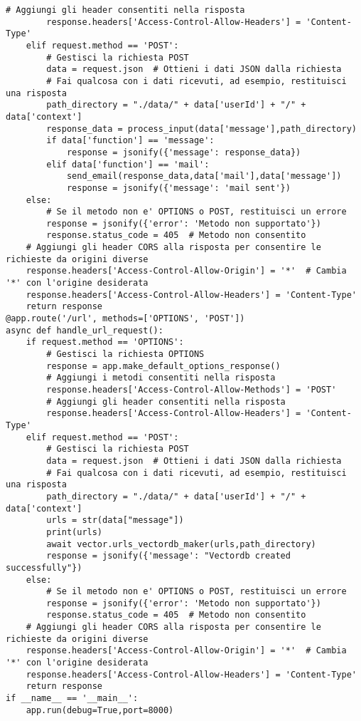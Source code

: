 \begin{lstlisting}[style=pythonstyle,caption={Codice del server.py}, label={lst:server}]
        # Aggiungi gli header consentiti nella risposta
        response.headers['Access-Control-Allow-Headers'] = 'Content-Type'
    elif request.method == 'POST':
        # Gestisci la richiesta POST
        data = request.json  # Ottieni i dati JSON dalla richiesta
        # Fai qualcosa con i dati ricevuti, ad esempio, restituisci una risposta
        path_directory = "./data/" + data['userId'] + "/" + data['context']
        response_data = process_input(data['message'],path_directory)
        if data['function'] == 'message':
            response = jsonify({'message': response_data})
        elif data['function'] == 'mail':
            send_email(response_data,data['mail'],data['message'])
            response = jsonify({'message': 'mail sent'})
    else:
        # Se il metodo non e' OPTIONS o POST, restituisci un errore
        response = jsonify({'error': 'Metodo non supportato'})
        response.status_code = 405  # Metodo non consentito
    # Aggiungi gli header CORS alla risposta per consentire le richieste da origini diverse
    response.headers['Access-Control-Allow-Origin'] = '*'  # Cambia '*' con l'origine desiderata
    response.headers['Access-Control-Allow-Headers'] = 'Content-Type'
    return response
@app.route('/url', methods=['OPTIONS', 'POST'])
async def handle_url_request():
    if request.method == 'OPTIONS':
        # Gestisci la richiesta OPTIONS
        response = app.make_default_options_response()
        # Aggiungi i metodi consentiti nella risposta
        response.headers['Access-Control-Allow-Methods'] = 'POST'
        # Aggiungi gli header consentiti nella risposta
        response.headers['Access-Control-Allow-Headers'] = 'Content-Type'
    elif request.method == 'POST':
        # Gestisci la richiesta POST
        data = request.json  # Ottieni i dati JSON dalla richiesta
        # Fai qualcosa con i dati ricevuti, ad esempio, restituisci una risposta
        path_directory = "./data/" + data['userId'] + "/" + data['context']
        urls = str(data["message"])
        print(urls)
        await vector.urls_vectordb_maker(urls,path_directory)
        response = jsonify({'message': "Vectordb created successfully"})
    else:
        # Se il metodo non e' OPTIONS o POST, restituisci un errore
        response = jsonify({'error': 'Metodo non supportato'})
        response.status_code = 405  # Metodo non consentito
    # Aggiungi gli header CORS alla risposta per consentire le richieste da origini diverse
    response.headers['Access-Control-Allow-Origin'] = '*'  # Cambia '*' con l'origine desiderata
    response.headers['Access-Control-Allow-Headers'] = 'Content-Type'
    return response
if __name__ == '__main__':
    app.run(debug=True,port=8000)
\end{lstlisting}
